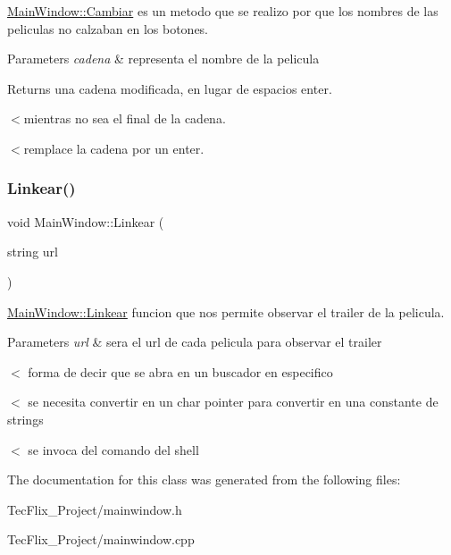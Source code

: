 \hyperlink{classMainWindow_abc32b15541cc089bb38675046b2d6f36}{Main\+Window\+::\+Cambiar} es un metodo que se realizo por que los nombres de las peliculas no calzaban en los botones. 


\begin{DoxyParams}{Parameters}
{\em cadena} & representa el nombre de la pelicula \\
\hline
\end{DoxyParams}
\begin{DoxyReturn}{Returns}
una cadena modificada, en lugar de espacios enter. 
\end{DoxyReturn}
$<$mientras no sea el final de la cadena.

$<$remplace la cadena por un enter. \mbox{\label{classMainWindow_ae50b6ad489f04f87597e89951ebb32f5}} 
\subsubsection{\texorpdfstring{Linkear()}{Linkear()}}
{\footnotesize\ttfamily void Main\+Window\+::\+Linkear (\begin{DoxyParamCaption}\item[{string}]{url }\end{DoxyParamCaption})}



\hyperlink{classMainWindow_ae50b6ad489f04f87597e89951ebb32f5}{Main\+Window\+::\+Linkear} funcion que nos permite observar el trailer de la pelicula. 


\begin{DoxyParams}{Parameters}
{\em url} & sera el url de cada pelicula para observar el trailer \\
\hline
\end{DoxyParams}
$<$ forma de decir que se abra en un buscador en especifico

$<$ se necesita convertir en un char pointer para convertir en una constante de strings

$<$ se invoca del comando del shell 

The documentation for this class was generated from the following files\+:\begin{DoxyCompactItemize}
\item 
Tec\+Flix\+\_\+\+Project/mainwindow.\+h\item 
Tec\+Flix\+\_\+\+Project/mainwindow.\+cpp\end{DoxyCompactItemize}
